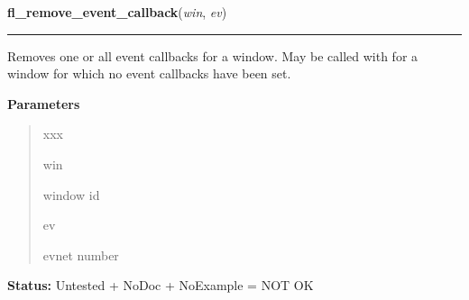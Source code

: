     \vspace{0.5ex}

\hspace{.8\funcindent}\begin{boxedminipage}{\funcwidth}

    \raggedright \textbf{fl\_remove\_event\_callback}(\textit{win}, \textit{ev})

    \vspace{-1.5ex}

    \rule{\textwidth}{0.5\fboxrule}
\setlength{\parskip}{2ex}
    Removes one or all event callbacks for a window. May be called with for
    a window for which no event callbacks have been set.

\setlength{\parskip}{1ex}
      \textbf{Parameters}
      \vspace{-1ex}

      \begin{quote}
        \begin{Ventry}{xxx}

          \item[win]

          window id

          \item[ev]

          evnet number

        \end{Ventry}

      \end{quote}

\textbf{Status:} Untested + NoDoc + NoExample = NOT OK



    \end{boxedminipage}

    \label{xformslib:library:fl_activate_event_callbacks}

    \vspace{0.5ex}

